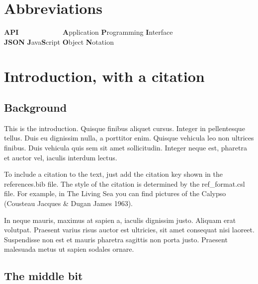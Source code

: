 \documentclass[12pt,a4paper,]{report}
\begin{document}
\hypertarget{abbreviations}{%
\chapter*{Abbreviations}\label{abbreviations}}

\begin{tabbing}
\textbf{API}~~~~~~~~~~~~ \= \textbf{A}pplication \textbf{P}rogramming \textbf{I}nterface \\  
\textbf{JSON} \> \textbf{J}ava\textbf{S}cript \textbf{O}bject \textbf{N}otation \\  
\end{tabbing}

\newpage

\setcounter{page}{1}
\doublespacing
\setlength{\parindent}{0.5in}

\hypertarget{introduction-with-a-citation}{%
\chapter{Introduction, with a
citation}\label{introduction-with-a-citation}}

\hypertarget{background}{%
\section{Background}\label{background}}

This is the introduction. Quisque finibus aliquet cursus. Integer in
pellentesque tellus. Duis eu dignissim nulla, a porttitor enim. Quisque
vehicula leo non ultrices finibus. Duis vehicula quis sem sit amet
sollicitudin. Integer neque est, pharetra et auctor vel, iaculis
interdum lectus.

To include a citation to the text, just add the citation key shown in
the references.bib file. The style of the citation is determined by the
ref\_format.csl file. For example, in The Living Sea you can find
pictures of the Calypso (Cousteau Jacques \& Dugan James 1963).

In neque mauris, maximus at sapien a, iaculis dignissim justo. Aliquam
erat volutpat. Praesent varius risus auctor est ultricies, sit amet
consequat nisi laoreet. Suspendisse non est et mauris pharetra sagittis
non porta justo. Praesent malesuada metus ut sapien sodales ornare.

\hypertarget{the-middle-bit}{%
\section{The middle bit}\label{the-middle-bit}}
\end{document}
